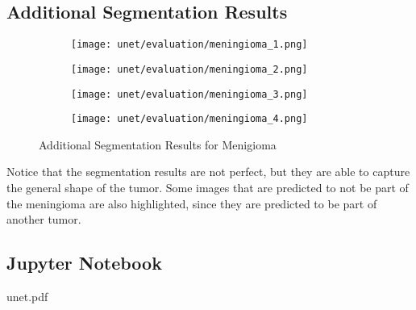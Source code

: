 \subsection{Additional Segmentation Results}

\begin{figure}[H]
  \centering
  \begin{subfigure}[b]{0.23\textwidth}
    \centering
    \texttt{[image: unet/evaluation/meningioma\_1.png]}
  \end{subfigure}
  \hfill
  \begin{subfigure}[b]{0.23\textwidth}
    \centering
    \texttt{[image: unet/evaluation/meningioma\_2.png]}
  \end{subfigure}
  \hfill
  \begin{subfigure}[b]{0.23\textwidth}
    \centering
    \texttt{[image: unet/evaluation/meningioma\_3.png]}
  \end{subfigure}
  \hfill
  \begin{subfigure}[b]{0.23\textwidth}
    \centering
    \texttt{[image: unet/evaluation/meningioma\_4.png]}
  \end{subfigure}
  \caption{Additional Segmentation Results for Menigioma}
  \label{fig:additional_malignoma_segmentation}
\end{figure}

Notice that the segmentation results are not perfect, but they are able to capture the general shape of the tumor. Some images that are predicted to not be part of the meningioma are also highlighted, since they are predicted to be part of another tumor.

\subsection{Jupyter Notebook}


{unet.pdf}

